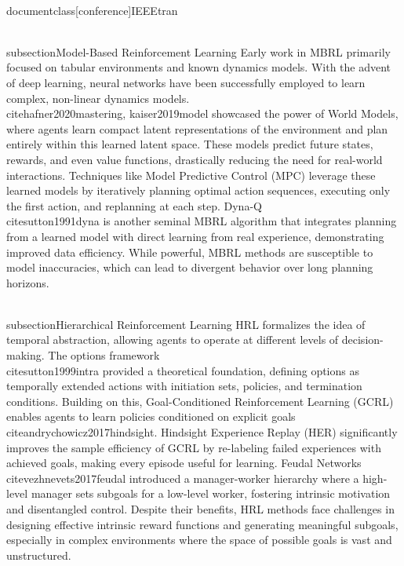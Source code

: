 \\documentclass[conference]{IEEEtran}
\begin{document}
\\subsection{Model-Based Reinforcement Learning}
Early work in MBRL primarily focused on tabular environments and known dynamics models. With the advent of deep learning, neural networks have been successfully employed to learn complex, non-linear dynamics models. \\cite{hafner2020mastering, kaiser2019model} showcased the power of World Models, where agents learn compact latent representations of the environment and plan entirely within this learned latent space. These models predict future states, rewards, and even value functions, drastically reducing the need for real-world interactions. Techniques like Model Predictive Control (MPC) leverage these learned models by iteratively planning optimal action sequences, executing only the first action, and replanning at each step. Dyna-Q \\cite{sutton1991dyna} is another seminal MBRL algorithm that integrates planning from a learned model with direct learning from real experience, demonstrating improved data efficiency. While powerful, MBRL methods are susceptible to model inaccuracies, which can lead to divergent behavior over long planning horizons.

\\subsection{Hierarchical Reinforcement Learning}
HRL formalizes the idea of temporal abstraction, allowing agents to operate at different levels of decision-making. The options framework \\cite{sutton1999intra} provided a theoretical foundation, defining options as temporally extended actions with initiation sets, policies, and termination conditions. Building on this, Goal-Conditioned Reinforcement Learning (GCRL) enables agents to learn policies conditioned on explicit goals \\cite{andrychowicz2017hindsight}. Hindsight Experience Replay (HER) significantly improves the sample efficiency of GCRL by re-labeling failed experiences with achieved goals, making every episode useful for learning. Feudal Networks \\cite{vezhnevets2017feudal} introduced a manager-worker hierarchy where a high-level manager sets subgoals for a low-level worker, fostering intrinsic motivation and disentangled control. Despite their benefits, HRL methods face challenges in designing effective intrinsic reward functions and generating meaningful subgoals, especially in complex environments where the space of possible goals is vast and unstructured.
\end{document}
